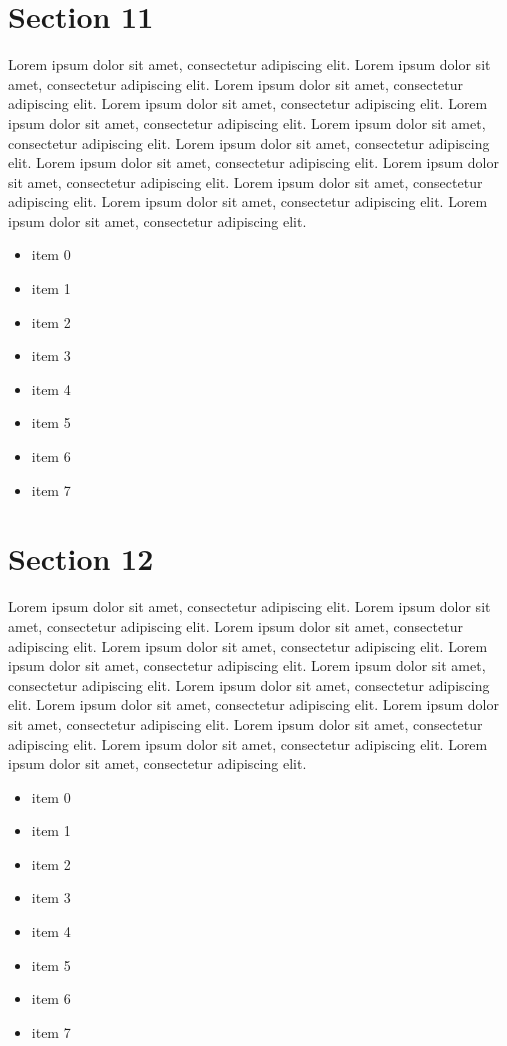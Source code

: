 \documentclass{article}
\begin{document}
\section{Section 11}
Lorem ipsum dolor sit amet, consectetur adipiscing elit. Lorem ipsum dolor sit amet, consectetur adipiscing elit. Lorem ipsum dolor sit amet, consectetur adipiscing elit. Lorem ipsum dolor sit amet, consectetur adipiscing elit. Lorem ipsum dolor sit amet, consectetur adipiscing elit. Lorem ipsum dolor sit amet, consectetur adipiscing elit. Lorem ipsum dolor sit amet, consectetur adipiscing elit. Lorem ipsum dolor sit amet, consectetur adipiscing elit. Lorem ipsum dolor sit amet, consectetur adipiscing elit. Lorem ipsum dolor sit amet, consectetur adipiscing elit. Lorem ipsum dolor sit amet, consectetur adipiscing elit. Lorem ipsum dolor sit amet, consectetur adipiscing elit. 
\begin{itemize}
\item item 0
\item item 1
\item item 2
\item item 3
\item item 4
\item item 5
\item item 6
\item item 7
\end{itemize}

\section{Section 12}
Lorem ipsum dolor sit amet, consectetur adipiscing elit. Lorem ipsum dolor sit amet, consectetur adipiscing elit. Lorem ipsum dolor sit amet, consectetur adipiscing elit. Lorem ipsum dolor sit amet, consectetur adipiscing elit. Lorem ipsum dolor sit amet, consectetur adipiscing elit. Lorem ipsum dolor sit amet, consectetur adipiscing elit. Lorem ipsum dolor sit amet, consectetur adipiscing elit. Lorem ipsum dolor sit amet, consectetur adipiscing elit. Lorem ipsum dolor sit amet, consectetur adipiscing elit. Lorem ipsum dolor sit amet, consectetur adipiscing elit. Lorem ipsum dolor sit amet, consectetur adipiscing elit. Lorem ipsum dolor sit amet, consectetur adipiscing elit. 
\begin{itemize}
\item item 0
\item item 1
\item item 2
\item item 3
\item item 4
\item item 5
\item item 6
\item item 7
\end{itemize}
\end{document}
